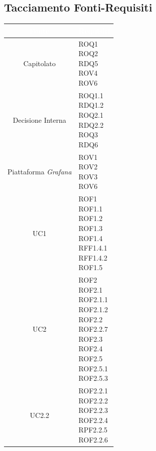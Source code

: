 \subsection{Tacciamento Fonti-Requisiti}\label{Tracciamento}
\begin{center}
\begin{longtable}[c]{|c|m{}|}
\hline
\rowcolor{bluelogo}\textbf{\textcolor{white}{Fonte}} & \textbf{\textcolor{white}{Requisiti}}\\
\hline \hline
\endhead
Capitolato & \makecell{ROQ1\\ROQ2\\RDQ5\\ROV4\\ROV6}\\
\hline
\rowcolor{grigio}Decisione Interna & \makecell{ROQ1.1\\RDQ1.2\\ROQ2.1\\RDQ2.2\\ROQ3\\RDQ6}\\
\hline
Piattaforma \textit{Grafana} & \makecell{ROV1\\ROV2\\ROV3\\ROV6}\\
\hline
\rowcolor{grigio}UC1 & \makecell{ROF1\\ROF1.1\\ROF1.2\\ROF1.3\\ROF1.4\\RFF1.4.1\\RFF1.4.2\\ROF1.5}\\
\hline
UC2 & \makecell{ROF2\\ROF2.1\\ROF2.1.1\\ROF2.1.2\\ROF2.2\\ROF2.2.7\\ROF2.3\\ROF2.4\\ROF2.5\\ROF2.5.1\\ROF2.5.3}\\
\hline
\rowcolor{grigio}UC2.2 & \makecell{ROF2.2.1\\ROF2.2.2\\ROF2.2.3\\ROF2.2.4\\RPF2.2.5\\ROF2.2.6}\\

\end{longtable}
\end{center}
